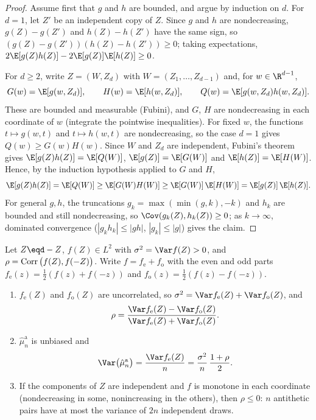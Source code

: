\begin{proof}
Assume first that $g$ and $h$ are bounded, and argue by induction on $d$. For $d=1$, let
$Z'$ be an independent copy of $Z$. Since $g$ and $h$ are nondecreasing, $g(Z)-g(Z')$ and
$h(Z)-h(Z')$ have the same sign, so $(g(Z)-g(Z'))(h(Z)-h(Z'))\ge0$; taking expectations,
$2\E[g(Z)h(Z)]-2\E[g(Z)]\E[h(Z)]\ge0$.

For $d\ge2$, write $Z=(W,Z_d)$ with $W=(Z_1,\dots,Z_{d-1})$ and, for $w\in\R^{d-1}$,
\[
  G(w)=\E[g(w,Z_d)],\qquad H(w)=\E[h(w,Z_d)],\qquad Q(w)=\E[g(w,Z_d)h(w,Z_d)] .
\]
These are bounded and measurable (Fubini), and $G$, $H$ are nondecreasing in each
coordinate of $w$ (integrate the pointwise inequalities). For fixed $w$, the functions
$t\mapsto g(w,t)$ and $t\mapsto h(w,t)$ are nondecreasing, so the case $d=1$ gives
$Q(w)\ge G(w)H(w)$. Since $W$ and $Z_d$ are independent, Fubini's theorem gives
$\E[g(Z)h(Z)]=\E[Q(W)]$, $\E[g(Z)]=\E[G(W)]$ and $\E[h(Z)]=\E[H(W)]$. Hence, by the
induction hypothesis applied to $G$ and $H$,
\[
  \E[g(Z)h(Z)]=\E[Q(W)]\ge\E[G(W)H(W)]\ge\E[G(W)]\,\E[H(W)]=\E[g(Z)]\,\E[h(Z)] .
\]
For general $g,h$, the truncations $g_k=\max(\min(g,k),-k)$ and $h_k$ are bounded and
still nondecreasing, so $\Cov(g_k(Z),h_k(Z))\ge0$; as $k\to\infty$, dominated convergence
($|g_kh_k|\le|gh|$, $|g_k|\le|g|$) gives the claim.
\end{proof}

\begin{proposition}\label{prop:cv-antithetic}
Let $Z\eqd-Z$, $f(Z)\in L^2$ with $\sigma^2=\Var f(Z)>0$, and
$\rho=\operatorname{Corr}\big(f(Z),f(-Z)\big)$. Write $f=f_{\mathrm e}+f_{\mathrm o}$ with the even and
odd parts $f_{\mathrm e}(z)=\frac12(f(z)+f(-z))$ and $f_{\mathrm o}(z)=\frac12(f(z)-f(-z))$.
\begin{enumerate}[label=(\roman*)]
  \item $f_{\mathrm e}(Z)$ and $f_{\mathrm o}(Z)$ are uncorrelated, so
    $\sigma^2=\Var f_{\mathrm e}(Z)+\Var f_{\mathrm o}(Z)$, and
    \[
      \rho=\frac{\Var f_{\mathrm e}(Z)-\Var f_{\mathrm o}(Z)}{\Var f_{\mathrm e}(Z)+\Var f_{\mathrm o}(Z)} .
    \]
  \item $\hat\mu^{\mathrm a}_n$ is unbiased and
    \begin{equation}\label{eq:cv-antithetic-var}
      \Var\big(\hat\mu^{\mathrm a}_n\big)=\frac{\Var f_{\mathrm e}(Z)}{n}=\frac{\sigma^2}{n}\,\frac{1+\rho}{2} .
    \end{equation}
  \item If the components of $Z$ are independent and $f$ is monotone in each coordinate
    (nondecreasing in some, nonincreasing in the others), then $\rho\le0$: $n$ antithetic
    pairs have at most the variance of $2n$ independent draws.
\end{enumerate}
\end{proposition}

